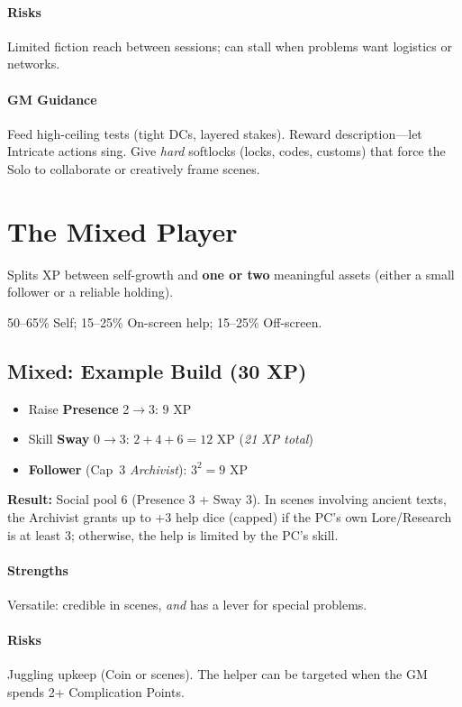 \documentclass[12pt]{book}
\begin{document}
\paragraph{Risks} Limited fiction reach between sessions; can stall when problems want logistics or networks.  
\paragraph{GM Guidance} Feed high-ceiling tests (tight DCs, layered stakes). Reward description—let Intricate actions sing. Give \emph{hard} softlocks (locks, codes, customs) that force the Solo to collaborate or creatively frame scenes.

\section{The Mixed Player}
\begin{description}[leftmargin=2cm]
  \item[Definition:] Splits XP between self-growth and \textbf{one or two} meaningful assets (either a small follower or a reliable holding).
  \item[Typical XP Spread:] 50--65\% Self; 15--25\% On-screen help; 15--25\% Off-screen.
\end{description}

\subsection*{Mixed: Example Build (30 XP)}
\begin{itemize}
  \item Raise \textbf{Presence} 2$\rightarrow$3: $9$ XP
  \item Skill \textbf{Sway} 0$\rightarrow$3: $2+4+6=12$ XP \hfill (\emph{21 XP total})
  \item \textbf{Follower} (Cap~3 \emph{Archivist}): $3^2=9$ XP
\end{itemize}
\textbf{Result:} Social pool 6 (Presence 3 + Sway 3). In scenes involving ancient texts, the Archivist grants up to +3 help dice (capped) if the PC's own Lore/Research is at least 3; otherwise, the help is limited by the PC's skill.

\paragraph{Strengths} Versatile: credible in scenes, \emph{and} has a lever for special problems.  
\paragraph{Risks} Juggling upkeep (Coin or scenes). The helper can be targeted when the GM spends 2+ Complication Points.  
\end{document}
